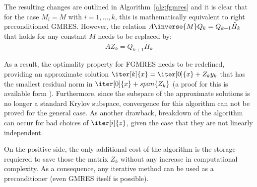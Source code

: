 \noindent The resulting changes are outlined in Algorithm~\hyperref[alg:fgmres]{\ref{alg:fgmres}} and it is clear that for the case $M_i=M$ with $i=1,\dots,k$, this is mathematically equivalent to right preconditioned GMRES. However, the relation $A\inverse{M}Q_k=Q_{k+1}\tilde{H}_k$ that holds for any constant $M$ needs to be replaced by:
\begin{equation}
    AZ_k=Q_{k+1}\tilde{H}_k
\end{equation}

\noindent As a result, the optimality property for FGMRES needs to be redefined, providing an approximate solution $\iter[k]{x}=\iter[0]{x}+Z_ky_k$ that has the smallest residual norm in $\iter[0]{x}+span\{Z_k\}$ (a proof for this is available form \cite{saad_iterative_2003}). Furthermore, since the subspace of the approximate solutions is no longer a standard Krylov subspace, convergence for this algorithm can not be proved for the general case. As another drawback, breakdown of the algorithm can occur for bad choices of $\iter[i]{z}$, given the case that they are not linearly independent. 

On the positive side, the only additional cost of the algorithm is the storage requiered to save those the matrix $Z_k$ without any increase in computational complexity. As a consequence, any iterative method can be used as a preconditioner (even GMRES itself is possible).